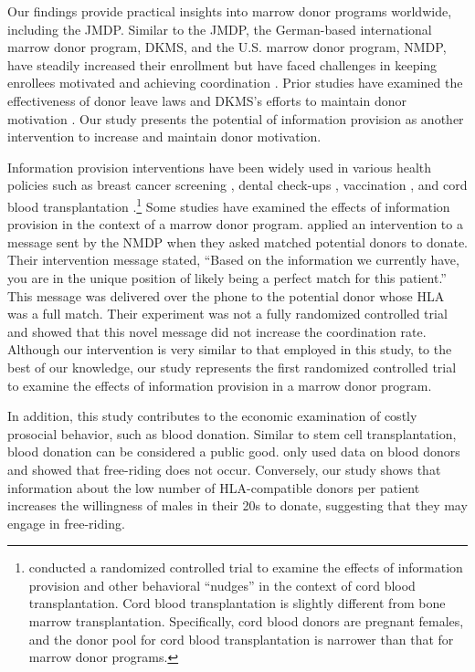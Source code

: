 \documentclass [12pt, a4paper]{article}
\begin{document}
Our findings provide practical insights into marrow donor programs worldwide, including the JMDP. Similar to the JMDP, the German-based international marrow donor program, DKMS, and the U.S. marrow donor program, NMDP, have steadily increased their enrollment but have faced challenges in keeping enrollees motivated and achieving coordination \citep{Switzer1999, Switzer2004, Haylock2024}. Prior studies have examined the effectiveness of donor leave laws \citep{Lacetera2014} and DKMS's efforts to maintain donor motivation \citep{Haylock2024}. Our study presents the potential of information provision as another intervention to increase and maintain donor motivation.

Information provision interventions have been widely used in various health policies such as breast cancer screening \citep{Bertoni2020}, dental check-ups \citep{Altmann2014}, vaccination \citep[e.g.,][]{Dai2021, Milkman2021}, and cord blood transplantation \citep{Grieco2018}.\footnote{\citet{Grieco2018} conducted a randomized controlled trial to examine the effects of information provision and other behavioral ``nudges'' in the context of cord blood transplantation. Cord blood transplantation is slightly different from bone marrow transplantation. Specifically, cord blood donors are pregnant females, and the donor pool for cord blood transplantation is narrower than that for marrow donor programs.} Some studies have examined the effects of information provision in the context of a marrow donor program. \citet{Switzer2018} applied an intervention to a message sent by the NMDP when they asked matched potential donors to donate. Their intervention message stated, ``Based on the information we currently have, you are in the unique position of likely being a perfect match for this patient.'' This message was delivered over the phone to the potential donor whose HLA was a full match. Their experiment was not a fully randomized controlled trial and showed that this novel message did not increase the coordination rate. Although our intervention is very similar to that employed in this study, to the best of our knowledge, our study represents the first randomized controlled trial to examine the effects of information provision in a marrow donor program.

In addition, this study contributes to the economic examination of costly prosocial behavior, such as blood donation. Similar to stem cell transplantation, blood donation can be considered a public good. \citet{Wildman2009} only used data on blood donors and showed that free-riding does not occur. Conversely, our study shows that information about the low number of HLA-compatible donors per patient increases the willingness of males in their 20s to donate, suggesting that they may engage in free-riding.
\end{document}
